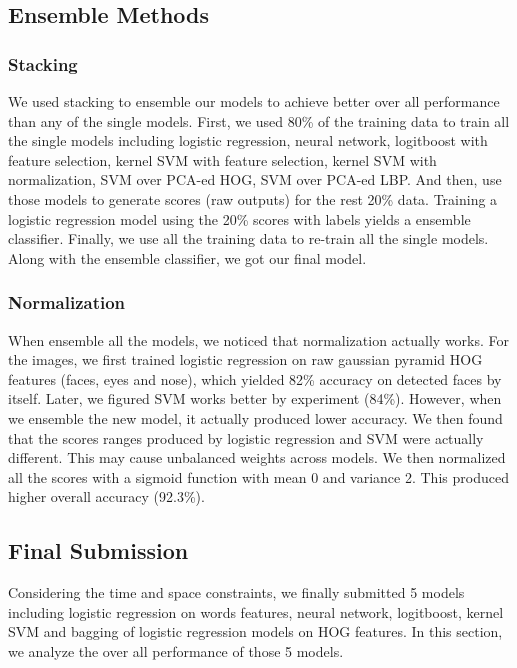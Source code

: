 \subsection{Ensemble Methods}
\subsubsection{Stacking}
We used stacking to ensemble our models to achieve better over all performance than any of the single models. First, we used 80\% of the training data to train all the single models including logistic regression, neural network, logitboost with feature selection, kernel SVM with feature selection, kernel SVM with normalization, SVM over PCA-ed HOG, SVM over PCA-ed LBP. And then, use those models to generate scores (raw outputs) for the rest 20\% data. Training a logistic regression model using the 20\% scores with labels yields a ensemble classifier. Finally, we use all the training data to re-train all the single models. Along with the ensemble classifier, we got our final model. 
\subsubsection{Normalization}
When ensemble all the models, we noticed that normalization actually works. For the images, we first trained logistic regression on raw gaussian pyramid HOG features (faces, eyes and nose), which yielded 82\% accuracy on detected faces by itself. Later, we figured SVM works better by experiment (84\%). However, when we ensemble the new model, it actually produced lower accuracy. We then found that the scores ranges produced by logistic regression and SVM were actually different. This may cause unbalanced weights across models. We then normalized all the scores with a sigmoid function with mean 0 and variance 2. This produced higher overall accuracy (92.3\%). 

\subsection{Final Submission}
Considering the time and space constraints, we finally submitted 5 models including logistic regression on words features, neural network, logitboost, kernel SVM and bagging of logistic regression models on HOG features. In this section, we analyze the over all performance of those 5 models.


